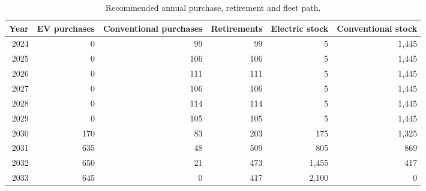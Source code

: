\begin{table}[htbp]
\centering
\caption{Recommended annual purchase, retirement and fleet path.}
\begin{tabular}{rrrrrr}
\toprule
Year & EV purchases & Conventional purchases & Retirements & Electric stock & Conventional stock\\\midrule
2024 & 0 & 99 & 99 & 5 & 1,445\\
2025 & 0 & 106 & 106 & 5 & 1,445\\
2026 & 0 & 111 & 111 & 5 & 1,445\\
2027 & 0 & 106 & 106 & 5 & 1,445\\
2028 & 0 & 114 & 114 & 5 & 1,445\\
2029 & 0 & 105 & 105 & 5 & 1,445\\
2030 & 170 & 83 & 203 & 175 & 1,325\\
2031 & 635 & 48 & 509 & 805 & 869\\
2032 & 650 & 21 & 473 & 1,455 & 417\\
2033 & 645 & 0 & 417 & 2,100 & 0\\
\bottomrule
\end{tabular}
\end{table}
